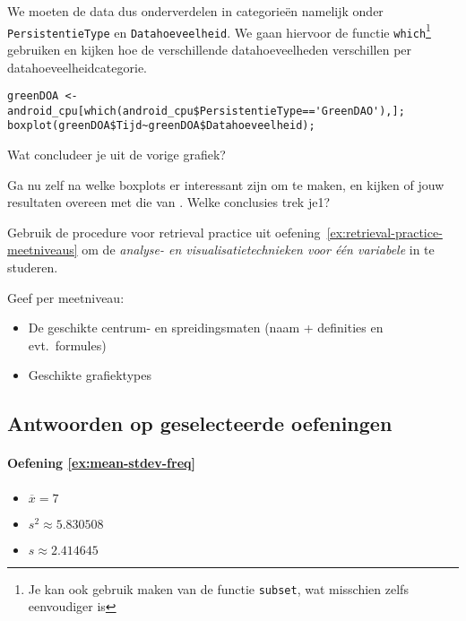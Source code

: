 We moeten de data dus onderverdelen in categorie\"en namelijk onder \texttt{PersistentieType} en \texttt{Datahoeveelheid}. We gaan hiervoor de functie \texttt{which}\footnote{Je kan ook gebruik maken van de functie \texttt{subset}, wat misschien zelfs eenvoudiger is} gebruiken en kijken hoe de verschillende datahoeveelheden verschillen per datahoeveelheidcategorie. 

\begin{lstlisting}
greenDOA <- android_cpu[which(android_cpu$PersistentieType=='GreenDAO'),];
boxplot(greenDOA$Tijd~greenDOA$Datahoeveelheid);
\end{lstlisting}

\begin{exercise}
  Wat concludeer je uit de vorige grafiek?
\end{exercise}

\begin{exercise}
  Ga nu zelf na welke boxplots er interessant zijn om te maken, en kijken of jouw resultaten overeen met die van \textcite{Akin2016}. Welke conclusies trek je1?
\end{exercise}

\begin{exercise}
  Gebruik de procedure voor retrieval practice uit oefening~\ref{ex:retrieval-practice-meetniveaus} om de \emph{analyse- en visualisatietechnieken voor één variabele} in te studeren.
  
  Geef per meetniveau:
  
  \begin{itemize}
    \item De geschikte centrum- en spreidingsmaten (naam + definities en evt.~formules)
    \item Geschikte grafiektypes
  \end{itemize}
\end{exercise}

\subsection{Antwoorden op geselecteerde oefeningen}

\paragraph{Oefening \ref{ex:mean-stdev-freq}}

\begin{itemize}
  \item $\overline{x} = 7$
  \item $s^2 \approx 5.830508$
  \item $s \approx 2.414645$
\end{itemize}

